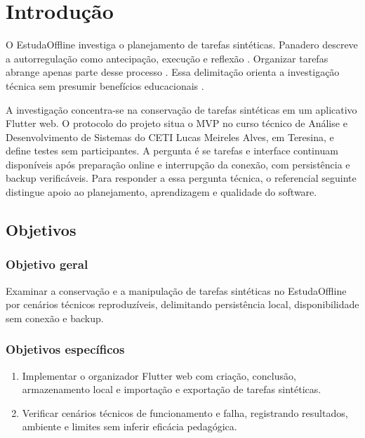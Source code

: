 \section{Introdução}

O EstudaOffline investiga o planejamento de tarefas sintéticas. Panadero descreve a autorregulação como antecipação, execução e reflexão \citep[p. 1, 3]{SU10}. Organizar tarefas abrange apenas parte desse processo \citep[p. 1, 3]{SU10}. Essa delimitação orienta a investigação técnica sem presumir benefícios educacionais \citep[p. 1, 3]{SU10}.

A investigação concentra-se na conservação de tarefas sintéticas em um aplicativo Flutter web. O protocolo do projeto situa o MVP no curso técnico de Análise e Desenvolvimento de Sistemas do CETI Lucas Meireles Alves, em Teresina, e define testes sem participantes. A pergunta é se tarefas e interface continuam disponíveis após preparação online e interrupção da conexão, com persistência e backup verificáveis. Para responder a essa pergunta técnica, o referencial seguinte distingue apoio ao planejamento, aprendizagem e qualidade do software.

\subsection{Objetivos}

\subsubsection{Objetivo geral}

Examinar a conservação e a manipulação de tarefas sintéticas no EstudaOffline por cenários técnicos reproduzíveis, delimitando persistência local, disponibilidade sem conexão e backup.

\subsubsection{Objetivos específicos}

\begin{enumerate}

\item Implementar o organizador Flutter web com criação, conclusão, armazenamento local e importação e exportação de tarefas sintéticas.

\item Verificar cenários técnicos de funcionamento e falha, registrando resultados, ambiente e limites sem inferir eficácia pedagógica.

\end{enumerate}

